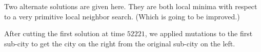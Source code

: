 \documentclass{article}
\begin{document}

Two alternate solutions are given here.
They are both local minima with respect to a very primitive local neighbor search.
(Which is going to be improved.)


After cutting the first solution at time $52221$, we applied mutations to the first sub-city to get the city on the right from the original sub-city on the left.
\end{document}
